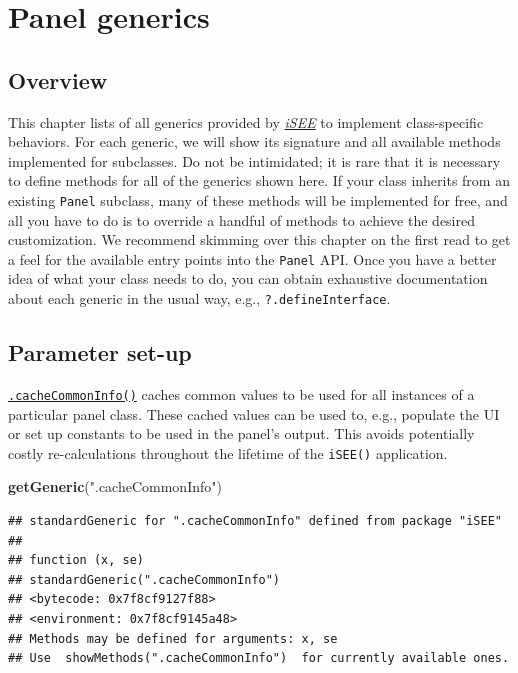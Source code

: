 \documentclass[
]{book}
\newenvironment{Shaded}{\begin{snugshade}}{\end{snugshade}}
\newcommand{\KeywordTok}[1]{\textcolor[rgb]{0.13,0.29,0.53}{\textbf{#1}}}
\newcommand{\NormalTok}[1]{#1}
\newcommand{\StringTok}[1]{\textcolor[rgb]{0.31,0.60,0.02}{#1}}
\begin{document}
\hypertarget{api}{%
\chapter{Panel generics}\label{api}}

\hypertarget{overview}{%
\section{Overview}\label{overview}}

This chapter lists of all generics provided by \emph{\href{https://bioconductor.org/packages/3.11/iSEE}{iSEE}} to implement class-specific behaviors.
For each generic, we will show its signature and all available methods implemented for subclasses.
Do not be intimidated; it is rare that it is necessary to define methods for all of the generics shown here.
If your class inherits from an existing \texttt{Panel} subclass, many of these methods will be implemented for free, and all you have to do is to override a handful of methods to achieve the desired customization.
We recommend skimming over this chapter on the first read to get a feel for the available entry points into the \texttt{Panel} API.
Once you have a better idea of what your class needs to do, you can obtain exhaustive documentation about each generic in the usual way, e.g., \texttt{?.defineInterface}.

\hypertarget{parameter-set-up}{%
\section{Parameter set-up}\label{parameter-set-up}}

\href{https://isee.github.io/iSEE/reference/setup-generics.html}{\texttt{.cacheCommonInfo()}} caches common values to be used for all instances of a particular panel class.
These cached values can be used to, e.g., populate the UI or set up constants to be used in the panel's output.
This avoids potentially costly re-calculations throughout the lifetime of the \texttt{iSEE()} application.

\begin{Shaded}
\begin{Highlighting}[]
\KeywordTok{getGeneric}\NormalTok{(}\StringTok{".cacheCommonInfo"}\NormalTok{)}
\end{Highlighting}
\end{Shaded}

\begin{verbatim}
## standardGeneric for ".cacheCommonInfo" defined from package "iSEE"
## 
## function (x, se) 
## standardGeneric(".cacheCommonInfo")
## <bytecode: 0x7f8cf9127f88>
## <environment: 0x7f8cf9145a48>
## Methods may be defined for arguments: x, se
## Use  showMethods(".cacheCommonInfo")  for currently available ones.
\end{verbatim}
\end{document}
